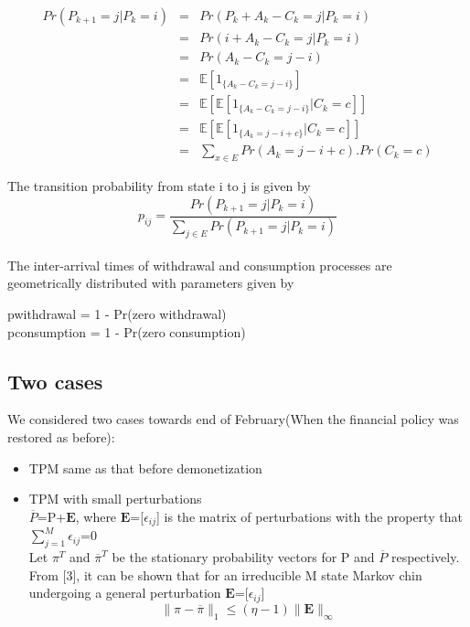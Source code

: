 \documentclass[12pt]{article}
\begin{document}
\begin{eqnarray}
Pr(P_{k+1} = j | P_{k} = i)&=&Pr(P_{k} + A_{k} - C_{k} = j | P_{k} = i) \\
&=&Pr(  i + A_{k} - C_{k} = j | P_{k}  = i)\\
&=&Pr(  A_{k} - C_{k} = j-i )\\
&=&\mathbb{E} [ 1_{\lbrace A_{k} - C_{k} = j-i \rbrace} ] \\
&=&\mathbb{E}[\mathbb{E} [ 1_{\lbrace A_{k} - C_{k} = j-i \rbrace}|C_{k} = c ] ]\\
&=&\mathbb{E}[\mathbb{E}[1_{\lbrace A_{k} = j-i+c \rbrace}|C_{k} = c ]] \\
&=&\sum_{x\in\textit{E}} Pr(A_{k} = j-i+c).Pr(C_{k} = c)
\end{eqnarray}

The transition probability from state i to j is given by
\begin{equation}
p_{ij} = \frac{Pr(P_{k+1} = j | P_{k} = i)}{\sum_{j\in\textit{E}}Pr(P_{k+1} = j | P_{k} = i)}
\end{equation}

\paragraph{}
The inter-arrival times of withdrawal and consumption processes are geometrically distributed with parameters given by
\begin{center}
 pwithdrawal = 1 - Pr(zero withdrawal)\\
 pconsumption = 1 - Pr(zero consumption)
\end{center}
\subsection{Two cases}
We considered two cases towards end of February(When the financial policy was restored as before):\\
\begin{itemize}
	\item TPM same as that before demonetization 
	\item TPM with small perturbations \\
	$\overline{P}$=P+$\textbf{E}$, \hspace{2pt} where $\textbf{E}$=[$\epsilon_{ij}$] is the matrix of perturbations with the property that $\sum_{j=1}^{M}\epsilon_{ij}$=0\\
	Let $\pi^{T}$ and $\overline{\pi}^{T}$ be the stationary probability vectors for P and $\overline{P}$ respectively.\\
	From [3], it can be shown that for an irreducible M state Markov chin undergoing a general perturbation $\textbf{E}$=[$\epsilon_{ij}$]\\
	\begin{equation}
		\| \pi - \overline{\pi}\|_{1} \leq (\eta-1)\|\textbf{E}\|_{\infty}
	\end{equation}
\end{itemize}
\end{document}
